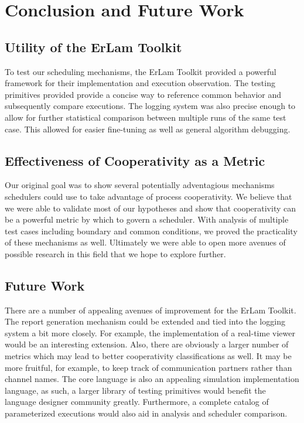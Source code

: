 \chapter{Conclusion and Future Work}
%
\label{chap:conclusions}

\section{Utility of the ErLam Toolkit}\label{sec:conclusions-erlam}

To test our scheduling mechanisms, the ErLam Toolkit provided a powerful framework
for their implementation and execution observation. The testing primitives provided
provide a concise way to reference common behavior and subsequently compare 
executions. The logging system was also precise enough to allow for further 
statistical comparison between multiple runs of the same test case. This allowed 
for easier fine-tuning as well as general algorithm debugging.

\section{Effectiveness of Cooperativity as a Metric}
\label{sec:conclusions-cooperativity}

Our original goal was to show several potentially adventagious mechanisms 
schedulers could use to take advantage of process cooperativity. We believe that 
we were able to validate most of our hypotheses and show that cooperativity can
be a powerful metric by which to govern a scheduler. With analysis of multiple 
test cases including boundary and common conditions, we proved the practicality of
these mechanisms as well. Ultimately we were able to open more avenues of possible
research in this field that we hope to explore further.

\section{Future Work}\label{sec:future-work}

There are a number of appealing avenues of improvement for the ErLam Toolkit. The
report generation mechanism could be extended and tied into the logging system a 
bit more  closely. For example, the implementation of a real-time viewer would be an 
interesting extension. Also, there are obviously a larger number of metrics which may lead
to better cooperativity classifications as well. It may be more fruitful, for 
example, to keep track of communication partners rather than channel names. 
The core language is also an appealing simulation implementation language, as such, a 
larger library of testing primitives would benefit the language designer community 
greatly. Furthermore, a complete catalog of parameterized executions would also aid 
in analysis and scheduler comparison.

